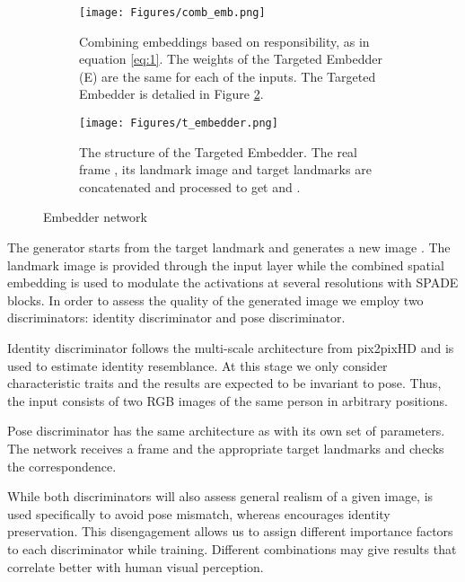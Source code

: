 \documentclass[11pt,a4paper]{article}
\begin{document}
\begin{figure}[!t]
\centering
\begin{subfigure}{0.57\textwidth}
    \texttt{[image: Figures/comb\_emb.png]}
    \caption{Combining embeddings based on responsibility, as in equation \eqref{eq:1}. The weights of the Targeted Embedder (E) are the same for each of the  inputs. The Targeted Embedder is detalied in Figure \ref{fig:temb}.}
    \label{fig:comb_emb}
\end{subfigure}\hspace{0.04\textwidth}
\begin{subfigure}{0.37\textwidth}
    \texttt{[image: Figures/t\_embedder.png]}
        \caption{The structure of the Targeted Embedder. The real frame , its landmark image  and target landmarks  are concatenated and processed to get  and .}
    \label{fig:temb}
\end{subfigure}
\caption[]{Embedder network}
\label{fig:embedder}
\end{figure}

The generator starts from the target landmark and generates a new image . The landmark image is provided through the input layer while the combined spatial embedding  is used to modulate the activations at several resolutions with SPADE blocks.
In order to assess the quality of the generated image we employ two discriminators: identity discriminator and pose discriminator.

Identity discriminator  follows the multi-scale architecture from pix2pixHD \cite{wang2018pix2pixHD} and is used to estimate identity resemblance. At this stage we only consider characteristic traits and the results are expected to be invariant to pose. Thus, the input consists of two RGB images of the same person in arbitrary positions.

Pose discriminator  has the same architecture as  with its own set of parameters. The network receives a frame and the appropriate target landmarks and checks the correspondence.  

While both discriminators will also assess general realism of a given image,  is used specifically to avoid pose mismatch, whereas  encourages identity preservation. This disengagement allows us to assign different importance factors to each discriminator while training. Different combinations may give results that correlate better with human visual perception.
\end{document}

